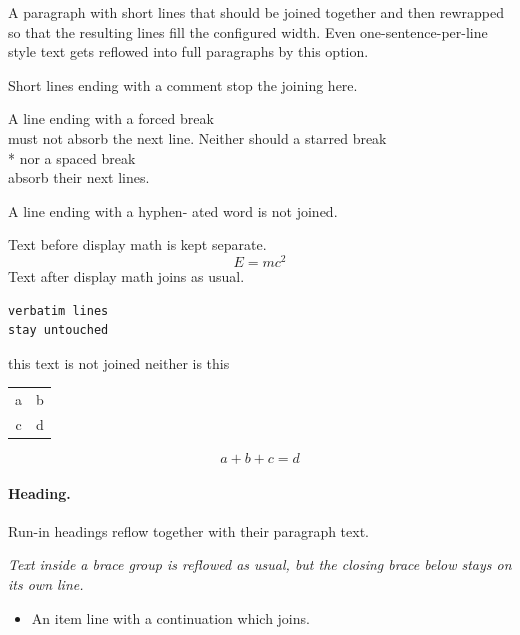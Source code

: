 \documentclass[a4paper,
11pt, twoside,
onecolumn]{article}
\begin{document}
A paragraph with
short lines that
should be joined together
and then rewrapped so that the resulting lines fill the configured
width.
Even one-sentence-per-line style text
gets reflowed into full paragraphs by this option.

Short lines
ending with a comment %
stop the joining here.

A line ending with a forced break \\
must not absorb the next line.
Neither should a starred break \\*
nor a spaced break \\[2pt]
absorb their next lines.

A line ending with a hyphen-
ated word is not joined.


Text before display math is kept separate.
\[
  E = m c^2
\]
Text after display math
joins as usual.

\begin{verbatim}
verbatim lines
stay untouched
\end{verbatim}

this text
is not joined %
neither
is this

\begin{tabular}{cc}
  a & b \\
  c & d \\
\end{tabular}


\begin{equation}
  a + b
  + c = d
\end{equation}

\paragraph{Heading.} Run-in headings
reflow together
with their paragraph text.

\emph{
  Text inside a brace group
  is reflowed as usual,
  but the closing brace below
  stays on its own line.
}

\begin{itemize}
  \item An item line
    with a continuation
    which joins.
\end{itemize}
\end{document}
